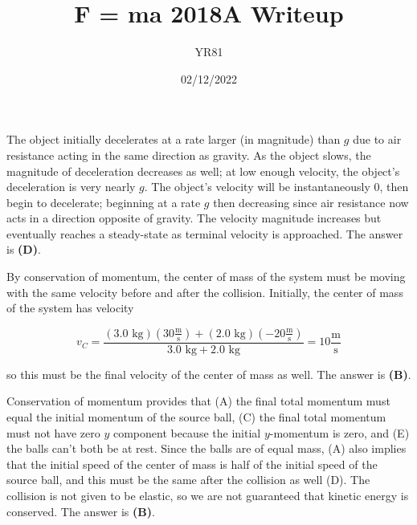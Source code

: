 \documentclass[12pt]{article}
\title{F = ma 2018A Writeup}
\author{YR81}
\date{02/12/2022}
\begin{document}
\maketitle



The object initially decelerates at a rate larger (in magnitude) than $g$ due to air resistance acting in the same direction as gravity. As the object slows, the magnitude of deceleration decreases as well; at low enough velocity, the object's deceleration is very nearly $g$. The object's velocity will be instantaneously $0$, then begin to decelerate; beginning at a rate $g$ then decreasing since air resistance now acts in a direction opposite of gravity. The velocity magnitude increases but eventually reaches a steady-state as terminal velocity is approached. The answer is \textbf{(D)}.


\vspace{2 \baselineskip}



By conservation of momentum, the center of mass of the system must be moving with the same velocity before and after the collision. Initially, the center of mass of the system has velocity

$$v_C = \frac{(3.0 \text{ kg}) \left( 30 \frac{\text{m}}{\text{s}} \right) + (2.0 \text{ kg}) \left( -20 \frac{\text{m}}{\text{s}} \right)}{3.0 \text{ kg} + 2.0 \text{ kg}} = 10 \frac{\text{m}}{\text{s}}$$

so this must be the final velocity of the center of mass as well. The answer is \textbf{(B)}.


\vspace{2 \baselineskip}



Conservation of momentum provides that (A) the final total momentum must equal the initial momentum of the source ball, (C) the final total momentum must not have zero $y$ component because the initial $y$-momentum is zero, and (E) the balls can't both be at rest. Since the balls are of equal mass, (A) also implies that the initial speed of the center of mass is half of the initial speed of the source ball, and this must be the same after the collision as well (D). The collision is not given to be elastic, so we are not guaranteed that kinetic energy is conserved. The answer is \textbf{(B)}.


\vspace{2 \baselineskip}
\end{document}
